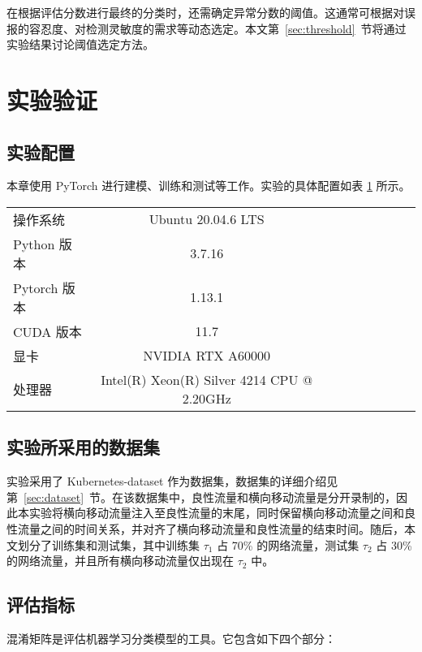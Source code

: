 {在根据评估分数进行最终的分类时，还需确定异常分数的阈值。这通常可根据对误报的容忍度、对检测灵敏度的需求等动态选定。本文第~\ref{sec:threshold}~节将通过实验结果讨论阈值选定方法。

\section{实验验证}

\subsection{实验配置}
本章使用 PyTorch 进行建模、训练和测试等工作。实验的具体配置如表 \ref{tab:experiment-environment} 所示。

\begin{table}[t]
    \label{tab:experiment-environment}
    \centering
    \footnotesize%
    \setlength{\tabcolsep}{4pt}%
    \renewcommand{\arraystretch}{1.2}%
    \begin{tabular}{lcccccccc}
        \hline
        操作系统 & Ubuntu 20.04.6 LTS\\
        Python 版本 & 3.7.16\\
        Pytorch 版本 & 1.13.1\\
        CUDA 版本 & 11.7\\
        显卡 & NVIDIA RTX A60000\\
        处理器 & Intel(R) Xeon(R) Silver 4214 CPU @ 2.20GHz\\
        \hline
    \end{tabular}
\end{table}

\subsection{实验所采用的数据集}
\label{sec:experiment-dataset}

实验采用了 Kubernetes-dataset 作为数据集，数据集的详细介绍见第~\ref{sec:dataset}~节。在该数据集中，良性流量和横向移动流量是分开录制的，因此本实验将横向移动流量注入至良性流量的末尾，同时保留横向移动流量之间和良性流量之间的时间关系，并对齐了横向移动流量和良性流量的结束时间。随后，本文划分了训练集和测试集，其中训练集 $\tau_1$ 占 70\% 的网络流量，测试集 $\tau_2$ 占 30\% 的网络流量，并且所有横向移动流量仅出现在 $\tau_2$ 中。

\subsection{评估指标}
\label{sec:kpi}
混淆矩阵是评估机器学习分类模型的工具。它包含如下四个部分：

}
